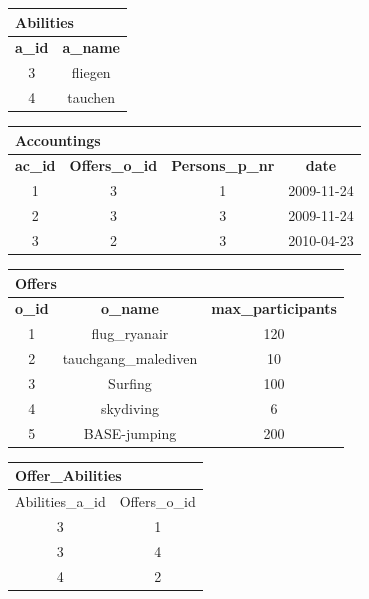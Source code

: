 \documentclass[12pt,a4paper,ngerman]{article}
\begin{document}
\begin{table}[h]
	\centering
	\begin{minipage}{0.3\textwidth}
		\begin{tabular}{| c | c |} 
			\hline
			\multicolumn{2}{|l|}{\textbf{Abilities}} \\ \hline
			\textbf{a\_id} & \textbf{a\_name}              \\ \hline \hline
			3 & fliegen											\\ \hline
			4 & tauchen											\\ \hline
		\end{tabular}
	\end{minipage}
	\begin{minipage}{0.6\textwidth}
		\begin{tabular}{| c | c | c | c |} 
			\hline
			\multicolumn{4}{|l|}{\textbf{Accountings}} \\ \hline
			\textbf{ac\_id} & \textbf{Offers\_o\_id} & \textbf{Persons\_p\_nr} & \textbf{date}            \\ \hline \hline
			1 & 3 & 1 & 2009-11-24											\\ \hline
			2 & 3 & 3 & 2009-11-24											\\ \hline
			3 & 2 & 3 & 2010-04-23											\\ \hline
		\end{tabular}
	\end{minipage}
\end{table}

\begin{table}[h]
	\centering
	\begin{tabular}{| c | c | c |}
		\hline
		\multicolumn{3}{|l|}{\textbf{Offers}} \\ \hline
		\textbf{o\_id} & \textbf{o\_name} & \textbf{max\_participants} \\ \hline \hline
		1 & flug\_ryanair & 120											\\ \hline
		2 & tauchgang\_malediven & 10											\\ \hline
		3 & Surfing & 100											\\ \hline
		4 & skydiving & 6											\\ \hline
		5 & BASE-jumping & 200											\\ \hline
	\end{tabular}
\end{table}

\begin{table}[h]
	\centering
	\begin{tabular}{| c | c |}
		\hline
		\multicolumn{2}{|l|}{\textbf{Offer\_Abilities}} \\ \hline
		Abilities\_a\_id & Offers\_o\_id               \\ \hline \hline
		3 & 1											\\ \hline
		3 & 4											\\ \hline
		4 & 2											\\ \hline
	\end{tabular}
\end{table}
\end{document}
